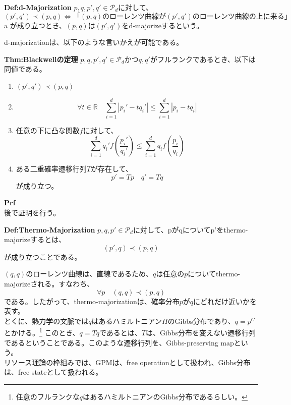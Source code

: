 \documentclass[a4paper,11pt]{jsarticle}
\numberwithin{equation}{section}
\begin{document}
\begin{itembox}[l]{\textbf{Def:d-Majorization}}
    $p,q,p',q' \in \mathcal{P}_d$に対して、
    \begin{equation}
        (p',q') \prec (p,q) \Leftrightarrow 「(p,q) \text{のローレンツ曲線が}(p',q') \text{のローレンツ曲線の上に来る」}
    \end{equation}a
    が成り立つとき、$(p,q)$は$(p',q')$をd-majorizeするという。
\end{itembox}
d-majorizationは、以下のような言いかえが可能である。\\
\begin{itembox}[l]{\textbf{Thm:Blackwellの定理}}
    $p,q,p',q' \in \mathcal{P}_d$かつ$q,q'$がフルランクであるとき、以下は同値である。
    \begin{enumerate}
        \item $(p',q') \prec (p,q)$
        \item 
        \begin{equation}
            \forall t \in \mathbb{R} \quad \sum_{i=1}^{d}|p_i'-tq_i'| \leq \sum_{i=1}^{d}|p_i-tq_i|
        \end{equation}
        \item 任意の下に凸な関数$f$に対して、
        \begin{equation}
            \sum_{i=1}^{d} q_i'f(\frac{p_i'}{q_i'}) \leq \sum_{i=1}^{d} q_i f(\frac{p_i}{q_i})
        \end{equation}
        \item ある二重確率遷移行列$T$が存在して、
        \begin{equation}
            p' = Tp \quad q' = Tq
        \end{equation}
        が成り立つ。
    \end{enumerate}
\end{itembox}
\textbf{Prf}\\
後で証明を行う。\\



\begin{itembox}[l]{\textbf{Def:Thermo-Majorization}}
    $p,q,p' \in \mathcal{P}_d$に対して、pがqについてp'をthermo-majorizeするとは、
    \begin{equation}
        (p',q) \prec (p,q)
    \end{equation}
    が成り立つことである。
\end{itembox}
$(q,q)$のローレンツ曲線は、直線であるため、$q$は任意の$p$についてthermo-majorizeされる。すなわち、
\begin{equation}
    \forall p \quad (q,q) \prec (p,q)
\end{equation}
である。したがって、thermo-majorizationは、確率分布$p$が$q$にどれだけ近いかを表す。\\
とくに、熱力学の文脈では$q$はあるハミルトニアン$H$のGibbs分布であり、$q=p^G$とかける。\footnote{任意のフルランクな$q$はあるハミルトニアンのGibbs分布であるらしい。}
このとき、$q=Tq$であるとは、$T$は、Gibbs分布を変えない遷移行列であるということである。このような遷移行列を、Gibbs-preserving mapという。\\
リソース理論の枠組みでは、GPMは、free operationとして扱われ、Gibbs分布は、free stateとして扱われる。\\
\end{document}
